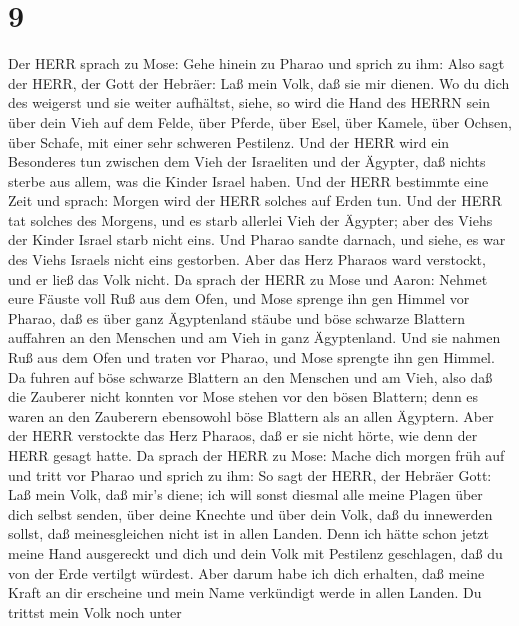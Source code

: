 \hypertarget{section-8}{%
\section{9}\label{section-8}}

 Der HERR sprach zu Mose: Gehe hinein zu Pharao und sprich
zu ihm: Also sagt der HERR, der Gott der Hebräer: Laß mein Volk, daß sie
mir dienen.  Wo du dich des weigerst und sie weiter
aufhältst,  siehe, so wird die Hand des HERRN sein über dein
Vieh auf dem Felde, über Pferde, über Esel, über Kamele, über Ochsen,
über Schafe, mit einer sehr schweren Pestilenz.  Und der
HERR wird ein Besonderes tun zwischen dem Vieh der Israeliten und der
Ägypter, daß nichts sterbe aus allem, was die Kinder Israel haben.
 Und der HERR bestimmte eine Zeit und sprach: Morgen wird
der HERR solches auf Erden tun.  Und der HERR tat solches
des Morgens, und es starb allerlei Vieh der Ägypter; aber des Viehs der
Kinder Israel starb nicht eins.  Und Pharao sandte darnach,
und siehe, es war des Viehs Israels nicht eins gestorben. Aber das Herz
Pharaos ward verstockt, und er ließ das Volk nicht.  Da
sprach der HERR zu Mose und Aaron: Nehmet eure Fäuste voll Ruß aus dem
Ofen, und Mose sprenge ihn gen Himmel vor Pharao,  daß es
über ganz Ägyptenland stäube und böse schwarze Blattern auffahren an den
Menschen und am Vieh in ganz Ägyptenland.  Und sie nahmen
Ruß aus dem Ofen und traten vor Pharao, und Mose sprengte ihn gen
Himmel. Da fuhren auf böse schwarze Blattern an den Menschen und am
Vieh,  also daß die Zauberer nicht konnten vor Mose stehen
vor den bösen Blattern; denn es waren an den Zauberern ebensowohl böse
Blattern als an allen Ägyptern.  Aber der HERR verstockte
das Herz Pharaos, daß er sie nicht hörte, wie denn der HERR gesagt
hatte.  Da sprach der HERR zu Mose: Mache dich morgen früh
auf und tritt vor Pharao und sprich zu ihm: So sagt der HERR, der
Hebräer Gott: Laß mein Volk, daß mir's diene;  ich will
sonst diesmal alle meine Plagen über dich selbst senden, über deine
Knechte und über dein Volk, daß du innewerden sollst, daß meinesgleichen
nicht ist in allen Landen.  Denn ich hätte schon jetzt
meine Hand ausgereckt und dich und dein Volk mit Pestilenz geschlagen,
daß du von der Erde vertilgt würdest.  Aber darum habe ich
dich erhalten, daß meine Kraft an dir erscheine und mein Name verkündigt
werde in allen Landen.  Du trittst mein Volk noch unter
